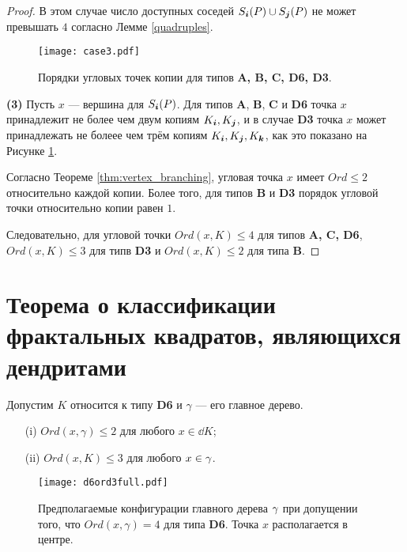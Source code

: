 \begin{proof}
В этом случае число доступных соседей $S_{\bm{i}}(P)\cup S_{\bm{j}}(P)$ не может превышать $4$ согласно Лемме \ref{quadruples}.

\begin{figure}[h]
    \centering
%
    \texttt{[image: case3.pdf]}
    \caption{Порядки угловых точек копии для типов {\bf A, B, C, D6, D3}.}
    \label{fig:case3}
\end{figure}

\textbf{(3)}
Пусть $x$ --- вершина для $S_{\bm{i}}(P)$.
Для типов \textbf{A},  \textbf{B}, \textbf{C} и \textbf{D6} точка $x$ принадлежит не более чем двум копиям $K_{\bm{i}}, K_{\bm{j}}$, и в случае \textbf{D3} точка $x$ может принадлежать не болеее чем трём копиям $K_{\bm{i}}, K_{\bm{j}}, K_{\bm{k}}$, как это показано на Рисунке \ref{fig:case3}.

Согласно Теореме \ref{thm:vertex_branching}, угловая точка $x$ имеет $Ord\leq2$ относительно каждой копии.
Более того, для типов \textbf{B} и \textbf{D3} порядок угловой точки относительно копии равен $1$.

Следовательно, для угловой точки $Ord(x,K)\leq4$ для типов {\bf A, C, D6}, $Ord(x,K)\leq3$ для типв {\bf D3} и 
$Ord(x,K)\leq2$ для типа {\bf B}.
\end{proof}



\section{Теорема о классификации фрактальных квадратов, являющихся дендритами}

\begin{proposition}\label{lem:d4bound}
Допустим $K$ относится к типу {\bf D6} и $\gamma$ --- его главное дерево.
\begin{itemize}[nolistsep]
    \item[(i)] $Ord(x,\gamma)\leq2$ для любого $x\in\dd K$;
    \item[(ii)] $Ord(x,K)\leq3$ для любого $x\in\gamma$.
\end{itemize}
\end{proposition}

\begin{figure}[H]
    \centering
    \texttt{[image: d6ord3full.pdf]}
    \caption{ 
        Предполагаемые конфигурации главного дерева $\gamma$ при допущении того, что $Ord(x,\gamma)=4$ для типа {\bf D6}. Точка $x$ располагается в центре.}
    \label{fig:d6ord3full}
\end{figure}

